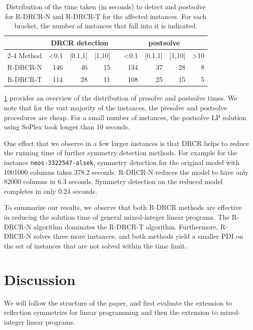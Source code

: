 \documentclass[pdflatex,sn-mathphys-num]{sn-jnl}%
\theoremstyle{thmstyleone}%
\theoremstyle{thmstylethree}%
\theoremstyle{thmstyletwo}%
\newcommand{\bracket}[2]{[#1,#2]}%
\begin{document}
\begin{table}[h]
    \centering
        \caption{Distribution of the time taken (in seconds) to detect and postsolve for R-DRCR-N and R-DRCR-T for the affected instances. For each bracket, the number of instances that fall into it is indicated.}
    \label{tab:drcr_timings}
    \begin{tabular}{lrrrcrrrr}
        \toprule
        & \multicolumn{3}{c}{DRCR detection} & &\multicolumn{4}{c}{postsolve}\\
        \cmidrule{2-4} \cmidrule{6-9}
        Method & <0.1 & \bracket{0.1}{1} & \bracket{1}{10} & & <0.1 & 
        \bracket{0.1}{1} & \bracket{1}{10} & >10 \\ 
        \midrule
        R-DRCR-N & 146 & 46 & 15 & & 134 & 37 & 28 & 8 \\
        R-DRCR-T & 114 & 28 & 11 & & 108 & 25 & 15 & 5 \\
        \bottomrule
    \end{tabular}

\end{table}

\cref{tab:drcr_timings} provides an overview of the distribution of presolve and postsolve times. We note that for the vast majority of the instances, the presolve and postsolve procedures are cheap. For a small number of instances, the postsolve LP solution using SoPlex took longer than 10 seconds. 

One effect that we observe in a few larger instances is that DRCR helps to reduce the running time of further symmetry detection methods. For example for the instance \texttt{neos-3322547-alsek}, symmetry detection for the original model with 1001000 columns takes 378.2 seconds. R-DRCR-N reduces the model to have only 82000 columns in 6.3 seconds. Symmetry detection on the reduced model completes in only 0.24 seconds.

To summarize our results, we observe that both R-DRCR methods are effective in reducing the solution time of general mixed-integer linear programs. The R-DRCR-N algorithm dominates the R-DRCR-T algorithm. Furthermore, R-DRCR-N solves three more instances, and both methods yield a smaller PDI on the set of instances that are not solved within the time limit. 

\section{Discussion}

We will follow the structure of the paper, and first evaluate the extension to reflection symmetries for linear programming and then the extension to mixed-integer linear programs.\\
\end{document}
